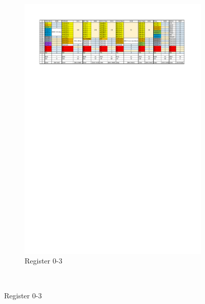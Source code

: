 \documentclass[a4paper,12pt]{scrreprt}
\begin{document}
  \begin{figure} [H]
        \centering
        \begin{subfigure}[b]{0.85\textwidth}
                \centering
                \includegraphics[width=1\textwidth]{pictures/spi_v0_0_1.pdf}
                \caption{Register 0-3}\label{fig:register 0-4}
        \end{subfigure}%
        ~ %
          

\end{figure}
\end{document}
